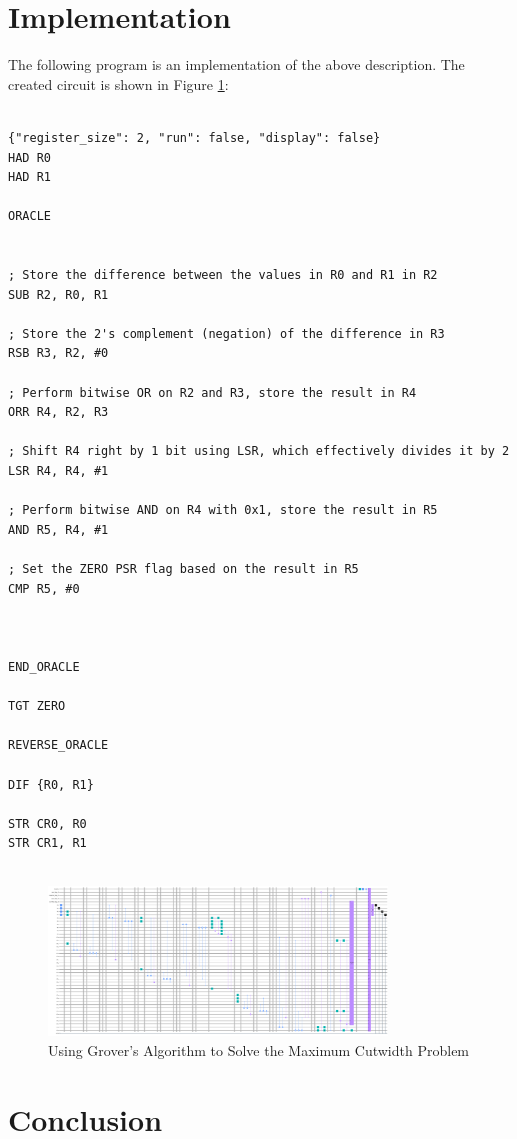 \section{Implementation}

The following program is an implementation of the above description. The created circuit is shown in Figure \ref{fig:Maximum_Cutwidth}:

\begin{lstlisting}

{"register_size": 2, "run": false, "display": false}
HAD R0
HAD R1

ORACLE


; Store the difference between the values in R0 and R1 in R2
SUB R2, R0, R1

; Store the 2's complement (negation) of the difference in R3
RSB R3, R2, #0

; Perform bitwise OR on R2 and R3, store the result in R4
ORR R4, R2, R3

; Shift R4 right by 1 bit using LSR, which effectively divides it by 2
LSR R4, R4, #1

; Perform bitwise AND on R4 with 0x1, store the result in R5
AND R5, R4, #1

; Set the ZERO PSR flag based on the result in R5
CMP R5, #0



END_ORACLE

TGT ZERO

REVERSE_ORACLE

DIF {R0, R1}

STR CR0, R0
STR CR1, R1


\end{lstlisting}

\begin{figure}[htp]
    \centering
    \includegraphics[width=9cm]{Figures/Maximum_Cutwidth_circuit.png}
    \caption{Using Grover's Algorithm to Solve the Maximum Cutwidth Problem}
    \label{fig:Maximum_Cutwidth}
\end{figure}

\section{Conclusion}\label{sec:conclusion}

